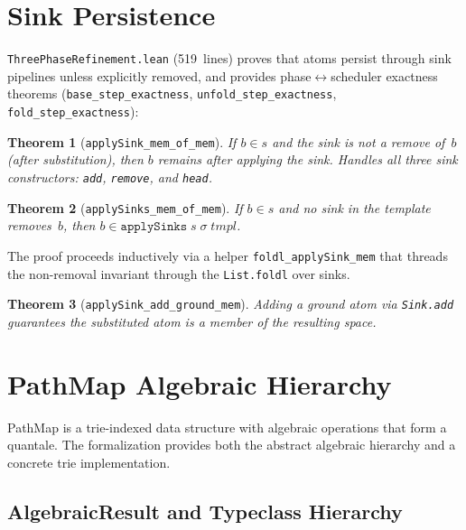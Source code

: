 \documentclass[11pt]{article}
\newtheorem{theorem}{Theorem}[section]
\theoremstyle{definition}
\theoremstyle{remark}
\newcommand{\PathMap}{\textup{PathMap}}
\begin{document}
\section{Sink Persistence}
\label{sec:persistence}

\texttt{ThreePhaseRefinement.lean} (519~lines) proves that atoms persist
through sink pipelines unless explicitly removed, and provides
phase$\leftrightarrow$scheduler exactness theorems
(\texttt{base\_step\_exactness}, \texttt{unfold\_step\_exactness},
\texttt{fold\_step\_exactness}):

\begin{theorem}[\texttt{applySink\_mem\_of\_mem}]
If $b \in s$ and the sink is not a remove of~$b$ (after substitution),
then $b$ remains after applying the sink.  Handles all three sink
constructors: \texttt{add}, \texttt{remove}, and \texttt{head}.
\end{theorem}

\begin{theorem}[\texttt{applySinks\_mem\_of\_mem}]
If $b \in s$ and no sink in the template removes~$b$, then $b \in
\texttt{applySinks}\;s\;\sigma\;\mathit{tmpl}$.
\end{theorem}

\noindent
The proof proceeds inductively via a helper
\texttt{foldl\_applySink\_mem} that threads the non-removal invariant
through the \texttt{List.foldl} over sinks.

\begin{theorem}[\texttt{applySink\_add\_ground\_mem}]
Adding a ground atom via \texttt{Sink.add} guarantees the substituted
atom is a member of the resulting space.
\end{theorem}

\section{PathMap Algebraic Hierarchy}
\label{sec:pathmap}

\PathMap{} is a trie-indexed data structure with algebraic operations that
form a quantale.  The formalization provides both the abstract algebraic
hierarchy and a concrete trie implementation.

\subsection{AlgebraicResult and Typeclass Hierarchy}
\end{document}
